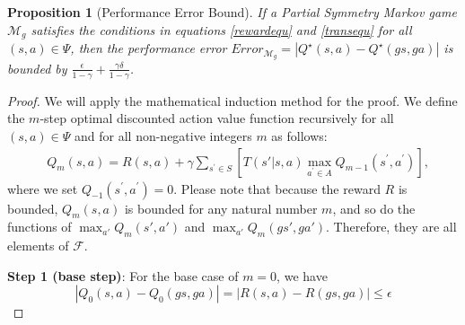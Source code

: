 \documentclass[letterpaper]{article} %
\theoremstyle{definition}
\newtheorem{proposition}{Proposition}
\begin{document}
\begin{proposition}[Performance Error Bound]
\label{prop1}
\textit{If a Partial Symmetry Markov game $\mathcal{M}_g$  satisfies the conditions in equations \eqref{rewardequ} and \eqref{transequ} for all $(s, a) \in \Psi$, then the performance error $\textit{Error}_{\mathcal{M}_g}=|Q^{\star}(s, a) - Q^{\star}(gs, ga)|$ is bounded by $\frac{\epsilon}{1-\gamma} + \frac{\gamma \delta}{1-\gamma}$.}
\end{proposition} \label{prop1}


\begin{proof} We will apply the mathematical induction method for the proof. We define the $m$-step optimal discounted action value function recursively for all $(s, a) \in \Psi$ and for all non-negative integers $m$ as follows:
\begin{equation}  
\begin{aligned} 
    &Q_{m}(s, a)=R(s, a)+\gamma \sum_{s^{\prime} \in S}[T(s'|s, a) \max _{a^{\prime} \in A} Q_{m-1}(s^{\prime}, a^{\prime})], \label{eq1}
\end{aligned}
\end{equation}
where we set $ Q_{-1}\left(s^{\prime}, a^{\prime}\right)=0 $. Please note that because the reward $R$ is bounded, $Q_{m}(s, a)$ is bounded for any natural number $m$, and so do the functions of $\max_{a'} Q_m(s', a')$ and $\max_{a'} Q_m(gs', ga')$. Therefore, they are all elements of $\mathcal{F}$.


\noindent
\textbf{Step 1 (base step)}: For the base case of $m=0$, we have
{\scriptsize
\begin{equation*}
|Q_{0}(s, a) - Q_{0}(gs, ga)|  = |R(s,a) - R(gs,ga)|  \leq \epsilon
\end{equation*}}


\end{proof}
\end{document}
